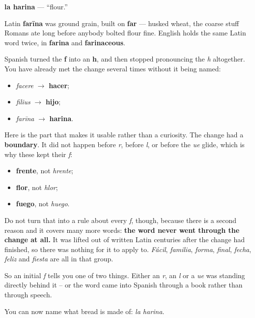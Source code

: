 \begin{cousinweb}
\textbf{la harina} — \textquotedblleft{}flour.\textquotedblright{}

Latin \textbf{farīna} was ground grain, built on \textbf{far} — husked wheat, the coarse stuff Romans ate long before anybody bolted flour fine. English holds the same Latin word twice, in \textbf{farina} and \textbf{farinaceous}.

Spanish turned the \textbf{f} into an \textbf{h}, and then stopped pronouncing the \emph{h} altogether. You have already met the change several times without it being named:

\begin{itemize}
\raggedright
  \item \emph{facere} $\to$ \textbf{hacer};
  \item \emph{filius} $\to$ \textbf{hijo};
  \item \emph{farīna} $\to$ \textbf{harina}.
\end{itemize}

Here is the part that makes it usable rather than a curiosity. The change had a \textbf{boundary}. It did not happen before \emph{r}, before \emph{l}, or before the \emph{ue} glide, which is why these kept their \emph{f}:

\begin{itemize}
\raggedright
  \item \textbf{frente}, not \emph{hrente};
  \item \textbf{flor}, not \emph{hlor};
  \item \textbf{fuego}, not \emph{huego}.
\end{itemize}

Do not turn that into a rule about every \emph{f}, though, because there is a second reason and it covers many more words: \textbf{the word never went through the change at all.} It was lifted out of written Latin centuries after the change had finished, so there was nothing for it to apply to. \emph{Fácil}, \emph{familia}, \emph{forma}, \emph{final}, \emph{fecha}, \emph{feliz} and \emph{fiesta} are all in that group.

So an initial \emph{f} tells you one of two things. Either an \emph{r}, an \emph{l} or a \emph{ue} was standing directly behind it -- or the word came into Spanish through a book rather than through speech.
\end{cousinweb}

\begin{grammarlens}[title={What you've built}]
You can now name what bread is made of: \emph{la harina}.
\end{grammarlens}

